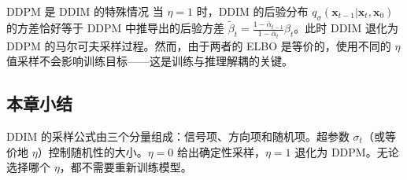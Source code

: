 \begin{warningbox}{DDPM 是 DDIM 的特殊情况}
当 $\eta = 1$ 时，DDIM 的后验分布 $q_\sigma(\mathbf{x}_{t-1}|\mathbf{x}_t, \mathbf{x}_0)$ 的方差恰好等于 DDPM 中推导出的后验方差 $\tilde{\beta}_t = \frac{1-\bar{\alpha}_{t-1}}{1-\bar{\alpha}_t}\beta_t$。此时 DDIM 退化为 DDPM 的马尔可夫采样过程。然而，由于两者的 ELBO 是等价的，使用不同的 $\eta$ 值采样不会影响训练目标——这是训练与推理解耦的关键。
\end{warningbox}

\subsection{本章小结}

DDIM 的采样公式由三个分量组成：信号项、方向项和随机项。超参数 $\sigma_t$（或等价地 $\eta$）控制随机性的大小。$\eta=0$ 给出确定性采样，$\eta=1$ 退化为 DDPM。无论选择哪个 $\eta$，都不需要重新训练模型。


